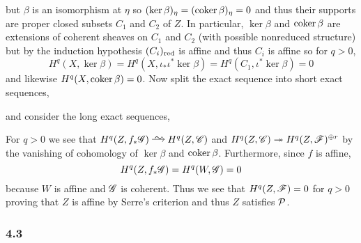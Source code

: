 \documentclass[12pt]{article}
\begin{document}
\begin{enumerate}
but $\beta$ is an isomorphism at $\eta$ so $(\ker{\beta})_\eta = (\operatorname{\mathrm{coker}}{\beta})_\eta = 0$ and thus their supports are proper closed subsets $C_1$ and $C_2$ of $Z$. In particular, $\ker{\beta}$ and $\operatorname{\mathrm{coker}}{\beta}$ are extensions of coherent sheaves on $C_1$ and $C_2$ (with possible nonreduced structure) but by the induction hypothesis $(C_i)_{\mathrm{red}}$ is affine and thus $C_i$ is affine so for $q > 0$,
\[ H^q(X, \ker{\beta}) = H^q(X, \iota_* \iota^* \ker{\beta}) = H^q(C_1, \iota^* \ker{\beta}) = 0 \]
and likewise $H^q(X, \operatorname{\mathrm{coker}}{\beta}) = 0$. Now split the exact sequence into short exact sequences,
\begin{center}
\end{center}
and consider the long exact sequences,
\begin{center}
\end{center}
For $q > 0$ we see that $H^q(Z, f_* \G) \iso H^q(Z, \sC)$ and $H^q(Z, \mathscr{C}) \twoheadrightarrow H^q(Z, \mathscr{F})^{\oplus r}$ by the vanishing of cohomology of $\ker{\beta}$ and $\operatorname{\mathrm{coker}}{\beta}$. Furthermore, since $f$ is affine,
\[ H^q(Z, f_* \mathscr{G}) = H^q(W, \mathscr{G}) = 0 \]
because $W$ is affine and $\mathscr{G}$ is coherent. Thus we see that $H^q(Z, \mathscr{F}) = 0$ for $q > 0$ proving that $Z$ is affine by Serre's criterion and thus $Z$ satisfies $\mathcal{P}$.
\end{enumerate}

\subsubsection{4.3}
\end{document}
